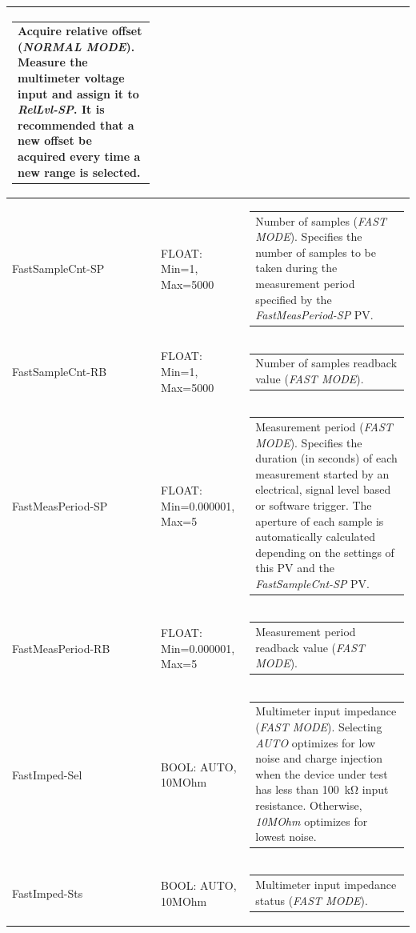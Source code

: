 \documentclass[openany]{article}
\begin{document}
\begin{longtable}{| m{3.0cm} m{4.5cm} m{7.0cm} |}
\begin{tabular}{@{}m{6cm}@{}}
						Acquire relative offset (\emph{NORMAL MODE}). Measure the multimeter voltage input and assign it to \emph{RelLvl-SP}. It is recommended that a new offset be acquired every time a new range is selected.
						\end{tabular} \\ \hline
		FastSampleCnt-SP & FLOAT: Min=1, Max=5000 & \begin{tabular}{@{}m{6cm}@{}}
	    					Number of samples (\emph{FAST MODE}). Specifies the number of samples to be taken during the measurement period specified by the \emph{FastMeasPeriod-SP} PV.
						\end{tabular} \\ \hline
		FastSampleCnt-RB & FLOAT: Min=1, Max=5000 & \begin{tabular}{@{}m{6cm}@{}}
	    					Number of samples readback value (\emph{FAST MODE}).
						\end{tabular} \\ \hline
		FastMeasPeriod-SP & FLOAT: Min=0.000001, Max=5 & \begin{tabular}{@{}m{6cm}@{}}
	    					Measurement period (\emph{FAST MODE}). Specifies the duration (in seconds) of each measurement started by an electrical, signal level based or software trigger. The aperture of each sample is automatically calculated depending on the settings of this PV and the \emph{FastSampleCnt-SP} PV.
						\end{tabular} \\ \hline
		FastMeasPeriod-RB & FLOAT: Min=0.000001, Max=5 & \begin{tabular}{@{}m{6cm}@{}}
	    					Measurement period readback value (\emph{FAST MODE}).
						\end{tabular} \\ \hline
		FastImped-Sel & BOOL: AUTO, 10MOhm & \begin{tabular}{@{}m{6cm}@{}}
	    					Multimeter input impedance (\emph{FAST MODE}). Selecting \emph{AUTO} optimizes for low noise and charge injection when the device under test has less than \SI{100}{\kohm} input resistance. Otherwise, \emph{10MOhm} optimizes for lowest noise.
						\end{tabular} \\ \hline
		FastImped-Sts & BOOL: AUTO, 10MOhm & \begin{tabular}{@{}m{6cm}@{}}
	    					Multimeter input impedance status (\emph{FAST MODE}).
						\end{tabular} \\ \hline

\end{longtable}
\end{document}
